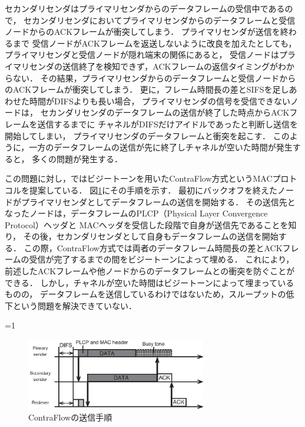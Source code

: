 \documentclass[master]{kuisthesis}		%
\newcounter{flagFig}
\begin{document}
			セカンダリセンダはプライマリセンダからのデータフレームの受信中であるので，
			セカンダリセンダにおいてプライマリセンダからのデータフレームと受信ノードからのACKフレームが衝突してしまう．
			プライマリセンダが送信を終わるまで
			受信ノードがACKフレームを返送しないように改良を加えたとしても，
			プライマリセンダと受信ノードが隠れ端末の関係にあると，
			受信ノードはプライマリセンダの送信終了を検知できず，ACKフレームの返信タイミングがわからない．
			その結果，プライマリセンダからのデータフレームと受信ノードからのACKフレームが衝突してしまう．
			更に，フレーム時間長の差とSIFSを足しあわせた時間がDIFSよりも長い場合，
			プライマリセンダの信号を受信できないノードは，
			セカンダリセンダのデータフレームの送信が終了した時点からACKフレームを送信するまでに
			チャネルがDIFSだけアイドルであったと判断し送信を開始してしまい，
			プライマリセンダのデータフレームと衝突を起こす．
			このように，一方のデータフレームの送信が先に終了しチャネルが空いた時間が発生すると，
			多くの問題が発生する．

			\par
			この問題に対し，\cite{contra}ではビジートーンを用いたContraFlow方式というMACプロトコルを提案している．
			図\ref{fig:contra_process}にその手順を示す．
			最初にバックオフを終えたノードがプライマリセンダとしてデータフレームの送信を開始する．
			その送信先となったノードは，データフレームのPLCP（Physical Layer Convergence Protocol）ヘッダと
			MACヘッダを受信した段階で自身が送信先であることを知り，
			その後，セカンダリセンダとして自身もデータフレームの送信を開始する．
			この際，ContraFlow方式では両者のデータフレーム時間長の差とACKフレームの受信が完了するまでの間をビジートーンによって埋める．
			これにより，前述したACKフレームや他ノードからのデータフレームとの衝突を防ぐことができる．
			しかし，チャネルが空いた時間はビジートーンによって埋まっているものの，
			データフレームを送信しているわけではないため，スループットの低下という問題を解決できていない．

			\ifnum\value{flagFig}=1 {\begin{figure}[htbp]
				\begin{center}
					\includegraphics[width=0.7\textwidth]{fig/contra_process.eps}
					\caption{ContraFlowの送信手順}
					\label{fig:contra_process}
				\end{center}
			\end{figure}}\fi
\end{document}
